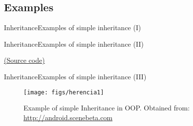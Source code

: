 \documentclass[10pt,compress]{beamer} %
\begin{document}
\subsection{Examples}
\begin{frame}{Inheritance}{Examples of simple inheritance (I)}
\end{frame}

\begin{frame}{Inheritance}{Examples of simple inheritance (II)}
\end{frame}

\begin{frame}[plain]%
	\begin{exampleblock}{}
	\vspace{-0.3cm} 
		
	\end{exampleblock}

	\href{https://gist.github.com/dfbarrero/9b30c749986885373c8c250b3901ec9d}{(Source code)}
\end{frame}

\begin{frame}{Inheritance}{Examples of simple inheritance (III)}
	\begin{figure}
		\texttt{[image: figs/herencia1]}
		\caption{{\scriptsize Example of simple Inheritance in OOP. Obtained from: \url{http://android.scenebeta.com}}}
	\end{figure}
\end{frame}
\end{document}
